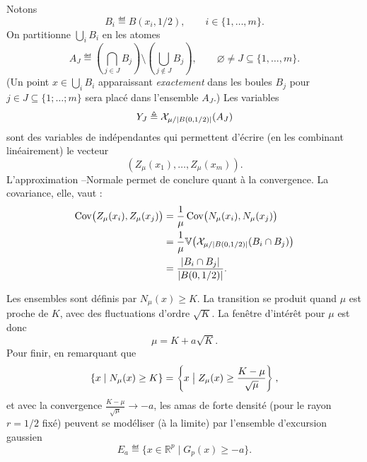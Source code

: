 \begin{Preuve}
Notons
\[
    B_i \eqdef B(x_i,1/2),
    \qquad i\in\{1,\ldots,m\}.
\]
On partitionne $\bigcup_i B_i$ en les atomes
\[
    A_J
    \eqdef
    \left(\bigcap_{j\in J}B_j\right)
    \setminus
    \left(\bigcup_{j\notin J}B_j\right),
    \qquad
    \varnothing\neq J\subseteq\{1,\ldots,m\}.
\]
(Un point $x \in \bigcup_i B_i$ apparaissant \emph{exactement} dans les boules $B_j$ pour $j \in J \subseteq\bigl\{ 1 ; \ldots ; m\bigr\}$ sera placé dans l'ensemble $A_J$.)
Les variables
\[
    Y_J\triangleq \mathcal X_{\mu/\lvert B(0,1/2) \rvert}(A_J)
\]
sont des variables de  indépendantes qui permettent d'écrire (en les combinant linéairement) le vecteur %
\[
    \left(Z_\mu(x_1),\ldots,Z_\mu(x_m)\right).
\]
L'approximation --Normale permet de conclure quant à la convergence. La covariance, elle, vaut :
\[
\begin{split}
    \operatorname{Cov}\bigl(Z_\mu(x_i),Z_\mu(x_j)\bigr)
    &=
    \frac1\mu
    \operatorname{Cov}\bigl(N_\mu(x_i),N_\mu(x_j)\bigr)\\
    &=
    \frac1\mu
    \mathbb V \bigl(\mathcal X_{\mu/\lvert B(0,1/2) \rvert}(B_i\cap B_j)\bigr)\\
    &=
    \frac{|B_i\cap B_j|}{\lvert B(0,1/2) \rvert}.
\end{split}
\]
\end{Preuve}

Les ensembles \KNN sont définis par $N_\mu(x) \ge K$. La transition se produit quand $\mu$ est proche de $K$, avec des fluctuations d'ordre $\sqrt K$. La fenêtre d'intérêt pour $\mu$ est donc
\[
    \mu = K+a\sqrt K.
\]
Pour finir, en remarquant que 
\[
    \{x \mid N_\mu(x)\ge K\}
    =
    \left\{
        x \bigm| Z_\mu(x)\ge \frac{K-\mu}{\sqrt\mu}
    \right\},
\]
et avec la convergence $ \frac{K-\mu}{\sqrt\mu} \to -a$, les amas de forte densité \KNN (pour le rayon $r=1/2$ fixé) peuvent se modéliser (à la limite) par l'ensemble d'excursion gaussien \cite{AzaisWschebor2009, AdlerTaylor2007}
\[
    E_a
    \eqdef
    \{x\in\mathbb R^p \mid G_p(x)\ge -a\}.
\]

